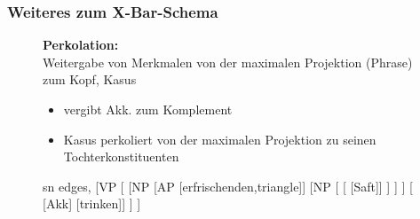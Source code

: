 \begin{frame}
\frametitle{Weiteres zum X-Bar-Schema}

\begin{figure}[b]

  	\begin{minipage}[b]{0.45\textwidth}
	\textbf{Perkolation:}\\
	 Weitergabe von Merkmalen von der maximalen Projektion (Phrase) zum Kopf, \zB Kasus
	 \begin{itemize}
	 	\item {} vergibt Akk. zum Komplement
	 	\item Kasus perkoliert von der maximalen Projektion zu seinen Tochterkonstituenten
	 \end{itemize}
  	\end{minipage}  
	\begin{minipage}[b]{0.45\textwidth}
	\centering
	\footnotesize{
		\begin{forest}
		sn edges,
		[VP 
			[ 
				[NP 
					[AP [erfrischenden,triangle]]
					[NP
						[ 
							[ [Saft]]
						]
					]
				]
				[\alert{} \\\alert{{[}Akk{]}} [trinken]]
			]
		]
		\end{forest}
		}
  	\end{minipage}  
\end{figure}

\end{frame}


